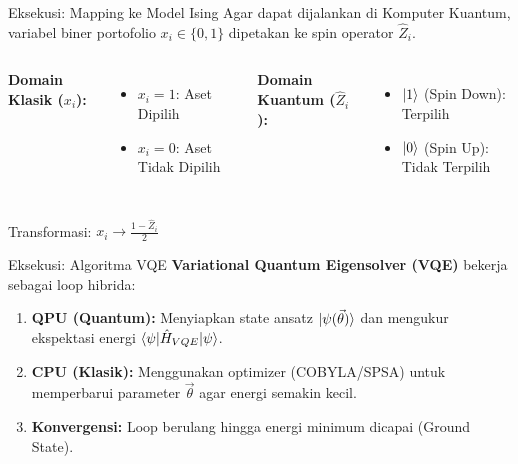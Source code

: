 \documentclass{beamer}
\begin{document}

\begin{frame}{Eksekusi: Mapping ke Model Ising}
    Agar dapat dijalankan di Komputer Kuantum, variabel biner portofolio $x_i \in \{0,1\}$ dipetakan ke spin operator $\hat{Z}_i$.
    
    \begin{columns}
        \textbf{Domain Klasik ($x_i$):}
        \begin{itemize}
            \item $x_i = 1$: Aset Dipilih
            \item $x_i = 0$: Aset Tidak Dipilih
        \end{itemize}
        
        \textbf{Domain Kuantum ($\hat{Z}_i$):}
        \begin{itemize}
            \item $\Ket{1}$ (Spin Down): Terpilih
            \item $\Ket{0}$ (Spin Up): Tidak Terpilih
        \end{itemize}
    \end{columns}
    
    \vspace{0.5cm}
    Transformasi: $x_i \rightarrow \frac{1-\hat{Z}_i}{2}$
\end{frame}

\begin{frame}{Eksekusi: Algoritma VQE}
    \textbf{Variational Quantum Eigensolver (VQE)} bekerja sebagai loop hibrida:
    
    \begin{enumerate}
        \item \textbf{QPU (Quantum):} Menyiapkan state ansatz $\ket{\psi(\vec{\theta})}$ dan mengukur ekspektasi energi $\braket{\psi | \hat{H}_{VQE} | \psi}$.
        \item \textbf{CPU (Klasik):} Menggunakan optimizer (COBYLA/SPSA) untuk memperbarui parameter $\vec{\theta}$ agar energi semakin kecil.
        \item \textbf{Konvergensi:} Loop berulang hingga energi minimum dicapai (Ground State).
    \end{enumerate}
\end{frame}
\end{document}
